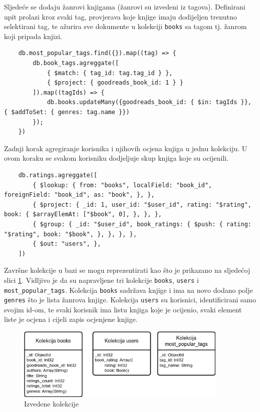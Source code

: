 \documentclass[]{foi}
\begin{document}
Sljedeće se dodaju žanrovi knjigama (žanrovi su izvedeni iz tagova). Definirani upit prolazi kroz svaki tag,
provjerava koje knjige imaju dodijeljen trenutno selektirani tag, te ažurira sve dokumente u kolekciji \texttt{books}
sa tagom tj. žanrom koji pripada knjizi.

\begin{verbatim}
    db.most_popular_tags.find({}).map((tag) => {
        db.book_tags.agreggate([
            { $match: { tag_id: tag.tag_id } },
            { $project: { goodreads_book_id: 1 } }
        ]).map((tagIds) => {
            db.books.updateMany({goodreads_book_id: { $in: tagIds }}, { $addToSet: { genres: tag.name }})
        });
    })
\end{verbatim}
\label{lst:zanrovi}

Zadnji korak agregiranje korisnika i njihovih ocjena knjiga u jednu kolekciju. U ovom koraku se svakom korisniku
dodjeljuje skup knjiga koje su ocijenili.

\begin{verbatim}
    db.ratings.agreggate([
        { $lookup: { from: "books", localField: "book_id", foreignField: "book_id", as: "book", }, },
        { $project: { _id: 1, user_id: "$user_id", rating: "$rating", book: { $arrayElemAt: ["$book", 0], }, }, },
        { $group: { _id: "$user_id", book_ratings: { $push: { rating: "$rating", book: "$book", }, }, }, },
        { $out: "users", },
    ])
\end{verbatim}
\label{lst:korisnici}

Završne kolekcije u bazi se mogu reprezentirati kao što je prikazano na sljedećoj slici \ref{fig:izvedene_kolekcije}.
Vidljivo je da su napravljene tri kolekcije \texttt{books}, \texttt{users} i \texttt{most\_popular\_tags}.
Kolekcija \texttt{books} sadržava knjige i ima na novo dodano polje \texttt{genres} što je lista žanrova knjige.
Kolekcija \texttt{users} su korisnici, identificirani samo svojim id-om, te svaki korisnik ima listu knjiga koje je
ocijenio, svaki element liste je ocjena i cijeli zapis ocjenjene knjige.

\begin{figure}[h!]
	\centering
	\includegraphics[width=0.9\textwidth]{slike/kolekcije.png}
	\caption{Izvedene kolekcije}
	\label{fig:izvedene_kolekcije}
\end{figure}
\end{document}
